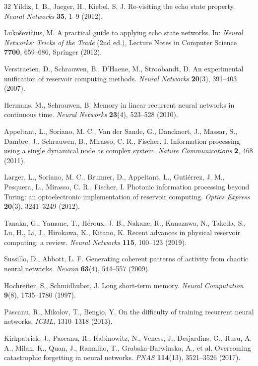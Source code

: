 \documentclass[preprint,12pt]{elsarticle}
\begin{document}
\begin{thebibliography}{32}
 Yildiz, I. B., Jaeger, H., Kiebel, S. J.
Re-visiting the echo state property. \emph{Neural Networks}
\textbf{35}, 1--9 (2012).

 Lukoševičius, M. A practical guide to
applying echo state networks. In: \emph{Neural Networks: Tricks of the
Trade} (2nd ed.), Lecture Notes in Computer Science \textbf{7700},
659--686, Springer (2012).

 Verstraeten, D., Schrauwen, B., D'Haene, M.,
Stroobandt, D. An experimental unification of reservoir computing
methods. \emph{Neural Networks} \textbf{20}(3), 391--403 (2007).

 Hermans, M., Schrauwen, B. Memory in linear
recurrent neural networks in continuous time. \emph{Neural Networks}
\textbf{23}(4), 523--528 (2010).

 Appeltant, L., Soriano, M. C., Van der Sande,
G., Danckaert, J., Massar, S., Dambre, J., Schrauwen, B., Mirasso, C.
R., Fischer, I. Information processing using a single dynamical node as
complex system. \emph{Nature Communications} \textbf{2}, 468 (2011).

 Larger, L., Soriano, M. C., Brunner, D.,
Appeltant, L., Gutiérrez, J. M., Pesquera, L., Mirasso, C. R., Fischer,
I. Photonic information processing beyond Turing: an optoelectronic
implementation of reservoir computing. \emph{Optics Express}
\textbf{20}(3), 3241--3249 (2012).

 Tanaka, G., Yamane, T., Héroux, J. B., Nakane, R.,
Kanazawa, N., Takeda, S., Lu, H., Li, J., Hirokawa, K., Kitano, K.
Recent advances in physical reservoir computing: a review.
\emph{Neural Networks} \textbf{115}, 100--123 (2019).

 Sussillo, D., Abbott, L. F. Generating coherent
patterns of activity from chaotic neural networks. \emph{Neuron}
\textbf{63}(4), 544--557 (2009).

 Hochreiter, S., Schmidhuber, J. Long
short-term memory. \emph{Neural Computation} \textbf{9}(8), 1735--1780
(1997).

 Pascanu, R., Mikolov, T., Bengio, Y. On the
difficulty of training recurrent neural networks. \emph{ICML},
1310--1318 (2013).

 Kirkpatrick, J., Pascanu, R., Rabinowitz, N.,
Veness, J., Desjardins, G., Rusu, A. A., Milan, K., Quan, J., Ramalho,
T., Grabska-Barwinska, A., et al. Overcoming catastrophic forgetting in
neural networks. \emph{PNAS} \textbf{114}(13), 3521--3526 (2017).


\end{thebibliography}
\end{document}

